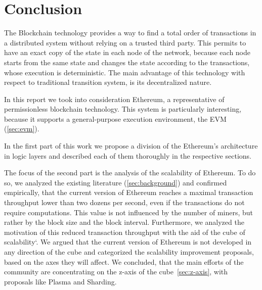 \section{Conclusion}
\label{sec:conclusion}
The Blockchain technology provides a way to find a total order of transactions
in a distributed system without relying on a trusted third party. This permits
to have an exact copy of the state in each node of the network, because each
node starts from the same state and changes the state according to the 
transactions, whose execution is deterministic. The main advantage of this 
technology with respect to traditional transition system, is its decentralized
nature.

In this report we took into consideration Ethereum, a representative of 
permissionless blockchain technology. This system is particularly interesting,
because it supports a general-purpose execution environment, the 
EVM (\autoref{sec:evm}).

In the first part of this work we propose a division of the Ethereum's 
architecture in logic layers and described each of them thoroughly in the 
respective sections.

The focus of the second part is the analysis of the scalability of Ethereum.
To do so, we analyzed the existing literature (\autoref{sec:background}) and 
confirmed empirically, that the current version of Ethereum reaches a maximal 
transaction throughput lower than two dozens per second, even if the
transactions do not require computations. This value is not influenced by the
number of miners, but rather by the block size and the block interval.
Furthermore, we analyzed the motivation of this reduced transaction throughput
with the aid of the cube of scalability`\cite{bib:art-of-scalability}. We 
argued that the current version of Ethereum is not developed in any direction 
of the cube and categorized the scalability improvement proposals, based on the 
axes they will affect. We concluded, that the main efforts of the community are 
concentrating on the z-axis of the cube~\autoref{sec:z-axis}, with proposals 
like Plasma and Sharding.

